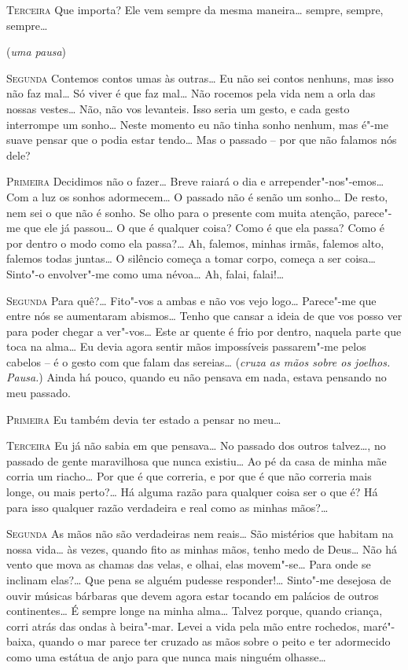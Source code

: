 \textsc{Terceira} Que importa? Ele vem sempre da
mesma maneira\ldots{} sempre, sempre, sempre\ldots{}

\hfill(\textit{uma pausa}) 

\textsc{Segunda} Contemos contos umas às outras\ldots{}
Eu não sei contos nenhuns,
mas isso não faz mal\ldots{} Só viver
é que faz mal\ldots{} Não rocemos pela vida
nem a orla das nossas vestes\ldots{} Não, não vos
levanteis. Isso seria um gesto, e cada gesto
interrompe um sonho\ldots{} Neste momento eu não tinha
sonho nenhum, mas é"-me suave pensar que o podia
estar tendo\ldots{} Mas o passado -- por que não falamos nós dele?

\textsc{Primeira} Decidimos não o fazer\ldots{}
Breve raiará o dia e
arrepender"-nos"-emos\ldots{} Com a luz os
sonhos adormecem\ldots{} O passado
não é senão um sonho\ldots{} De resto, nem sei o que não é sonho.
Se olho para o presente com muita atenção, parece"-me que ele já
passou\ldots{} O que é qualquer coisa? Como é que ela passa?
Como é por dentro o modo como ela passa?\ldots{}
Ah, falemos, minhas irmãs, falemos			%
alto, falemos todas juntas\ldots{} 
O silêncio começa a tomar corpo, começa a
ser coisa\ldots{} Sinto"-o envolver"-me
como uma névoa\ldots{} Ah, falai, falai!\ldots{}

\textsc{Segunda} Para quê?\ldots{} Fito"-vos a
ambas e não vos vejo logo\ldots{}
Parece"-me que entre nós se aumentaram abismos\ldots{}
Tenho que cansar a ideia de que vos posso ver para poder
chegar a ver"-vos\ldots{} Este ar quente é frio por dentro,
naquela parte que toca na alma\ldots{} Eu devia
agora sentir mãos impossíveis passarem"-me pelos
cabelos -- é o gesto com que falam das sereias\ldots{} 
(\textit{cruza as mãos sobre os joelhos. Pausa.})
Ainda há pouco, quando eu não pensava em nada, estava pensando
no meu passado. 

\textsc{Primeira} Eu também devia ter estado a pensar no meu\ldots{}

\textsc{Terceira} Eu já não sabia em que pensava\ldots{} 
No passado dos outros talvez\ldots{}, no passado de
gente maravilhosa que nunca existiu\ldots{} Ao pé
da casa de minha mãe corria um riacho\ldots{} Por que
é que correria, e por que é que não correria mais longe,
ou mais perto?\ldots{} Há alguma razão
para qualquer coisa ser o que é? Há para isso qualquer
razão verdadeira e real como as minhas mãos?\ldots{}

\textsc{Segunda} As mãos não são verdadeiras nem reais\ldots{}
São mistérios que
habitam na nossa vida\ldots{} às vezes, quando fito 
as minhas mãos, tenho
medo de Deus\ldots{} Não há vento que mova as
chamas das velas, e olhai,
elas movem"-se\ldots{} Para onde se inclinam
elas?\ldots{} Que pena se alguém
pudesse responder!\ldots{} Sinto"-me desejosa
de ouvir músicas bárbaras que
devem agora estar tocando em palácios de
outros continentes\ldots{} É sempre
longe na minha alma\ldots{} Talvez porque,
quando criança, corri atrás das
ondas à beira"-mar. Levei a vida pela mão entre rochedos,
maré"-baixa, quando o mar parece ter cruzado as mãos
sobre o peito e
ter adormecido como uma estátua de anjo para que 
nunca mais ninguém olhasse\ldots{}

